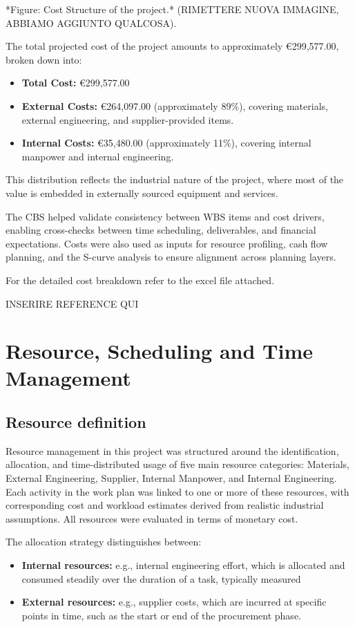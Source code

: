 \documentclass[12pt]{article}
\begin{document}
*Figure: Cost Structure of the project.* (RIMETTERE NUOVA IMMAGINE, ABBIAMO AGGIUNTO QUALCOSA).

The total projected cost of the project amounts to approximately €299,577.00, broken down into:
\begin{itemize}
        \item \textbf{Total Cost:} €299,577.00
        \item \textbf{External Costs:} €264,097.00 (approximately 89\%), covering materials, external engineering, and supplier-provided items.
        \item \textbf{Internal Costs:} €35,480.00 (approximately 11\%), covering internal manpower and internal engineering.
\end{itemize}

This distribution reflects the industrial nature of the project, where most of the value is embedded in externally sourced equipment and services.

The CBS helped validate consistency between WBS items and cost drivers, enabling cross-checks between time scheduling, deliverables, and financial expectations. Costs were also used as inputs for resource profiling, cash flow planning, and the S-curve analysis to ensure alignment across planning layers.

For the detailed cost breakdown refer to the excel file attached.

INSERIRE REFERENCE QUI

\section{Resource, Scheduling and Time Management}
\subsection{Resource definition}
Resource management in this project was structured around the identification, allocation, and time-distributed usage of five main resource categories: Materials, External Engineering, Supplier, Internal Manpower, and Internal Engineering. Each activity in the work plan was linked to one or more of these resources, with corresponding cost and workload estimates derived from realistic industrial assumptions. All resources were evaluated in terms of monetary cost.

The allocation strategy distinguishes between:
\begin{itemize}
        \item \textbf{Internal resources:} e.g., internal engineering effort, which is allocated and consumed steadily over the duration of a task, typically measured
        \item \textbf{External resources:} e.g., supplier costs, which are incurred at specific points in time, such as the start or end of the procurement phase.
\end{itemize}
\end{document}
